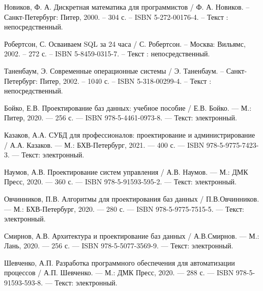 \begin{thebibliography}{9}
    Новиков, Ф. А. Дискретная математика для программистов / Ф. А. Новиков. – Санкт-Петербург: Питер, 2000. – 304 с. – ISBN 5-272-00176-4. – Текст : непосредственный.
    
    Робертсон, С. Осваиваем SQL за 24 часа / С. Робертсон. – Москва: Вильямс, 2002. – 272 с. – ISBN 5-8459-0315-7. – Текст : непосредственный.
    
    Таненбаум, Э. Современные операционные системы / Э. Таненбаум. – Санкт-Петербург: Питер, 2002. – 1040 с. – ISBN 5-318-00299-4. – Текст : непосредственный.
    
    Бойко, Е.В. Проектирование баз данных: учебное пособие / Е.В. Бойко. — М.: Питер, 2020. — 256 с. — ISBN 978-5-4461-0973-8. — Текст: электронный.
    
    Казаков, А.А. СУБД для профессионалов: проектирование и администрирование / А.А. Казаков. — М.: БХВ-Петербург, 2021. — 400 с. — ISBN 978-5-9775-7423-3. — Текст: электронный.
    
    Наумов, А.В. Проектирование систем управления / А.В. Наумов. —
    М.: ДМК Пресс, 2020. — 360 с. — ISBN 978-5-91593-595-2. — Текст: электронный.
    
    Овчинников, П.В. Алгоритмы для проектирования баз данных / П.В.Овчинников. — М.: БХВ-Петербург, 2020. — 280 с. — ISBN 978-5-9775-7515-5. — Текст: электронный.
    
    Смирнов, А.В. Архитектура и проектирование баз данных / А.В.Смирнов. — М.: Лань, 2020. — 256 с. — ISBN 978-5-5077-3569-9. — Текст: электронный.
    
    Шевченко, А.П. Разработка программного обеспечения для автоматизации процессов / А.П. Шевченко. — М.: ДМК Пресс, 2020. — 288 с. — ISBN 978-5-91593-593-8. — Текст: электронный.
    
\end{thebibliography}

